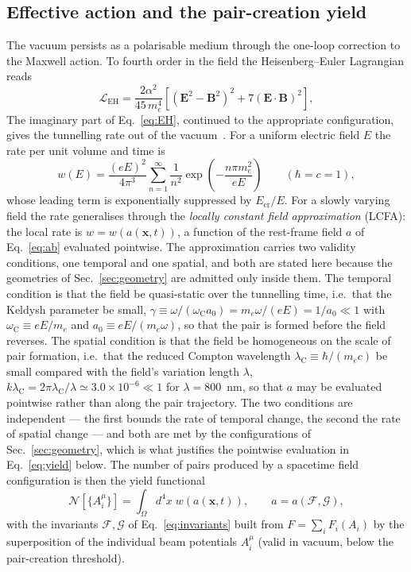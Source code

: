 \documentclass[aps,prd,reprint,superscriptaddress,nofootinbib,floatfix]{revtex4-2}
\begin{document}
\subsection{Effective action and the pair-creation yield}

The vacuum persists as a polarisable medium through the one-loop correction to
the Maxwell action. To fourth order in the field the Heisenberg--Euler
Lagrangian reads~\cite{HeisenbergEuler1936}
\begin{equation}
\mathcal{L}_{\mathrm{EH}}
=\frac{2\alpha^2}{45\,m_e^4}
\left[\left(\mathbf{E}^2-\mathbf{B}^2\right)^2
+7\left(\mathbf{E}\cdot\mathbf{B}\right)^2\right],
\label{eq:EH}
\end{equation}
The imaginary part of Eq.~\eqref{eq:EH}, continued to the appropriate
configuration, gives the tunnelling rate out of the
vacuum~\cite{Schwinger1951}. For a uniform electric
field $E$ the rate per unit volume and time is
\begin{equation}
w(E)=\frac{(eE)^2}{4\pi^3}
\sum_{n=1}^{\infty}\frac{1}{n^2}
\exp\!\left(-\frac{n\pi m_e^2}{eE}\right)
\qquad(\hbar=c=1),
\label{eq:schwinger_rate}
\end{equation}
whose leading term is exponentially suppressed by $E_{\mathrm{cr}}/E$.
For a slowly varying field the rate generalises through the \emph{locally
constant field approximation} (LCFA): the local rate is
$w=w(a(\mathbf{x},t))$, a function of the rest-frame field $a$ of
Eq.~\eqref{eq:ab} evaluated pointwise. The approximation carries two
validity conditions, one temporal and one spatial, and both are stated
here because the geometries of Sec.~\ref{sec:geometry} are admitted only
inside them. The temporal condition is that the field be quasi-static over
the tunnelling time, i.e.\ that the Keldysh parameter be small,
$\gamma\equiv\omega/(\omega_{\mathrm{C}}a_0)=m_e\omega/(eE)=1/a_0\ll1$
with $\omega_{\mathrm{C}}\equiv eE/m_e$ and
$a_0\equiv eE/(m_e\omega)$, so that the pair is formed before the field
reverses. The spatial condition is that the field be homogeneous on the
scale of pair formation, i.e.\ that the reduced Compton wavelength
$\lambda_{\mathrm{C}}\equiv\hbar/(m_ec)$ be small compared with the
field's variation length $\lambda$,
$k\lambda_{\mathrm{C}}=2\pi\lambda_{\mathrm{C}}/\lambda\simeq3.0\times10^{-6}\ll1$ for $\lambda=800$~nm, so that $a$ may be evaluated
pointwise rather than along the pair trajectory. The two conditions are
independent --- the first bounds the rate of temporal change, the second
the rate of spatial change --- and both are met by the configurations of
Sec.~\ref{sec:geometry}, which is what justifies the pointwise evaluation
in Eq.~\eqref{eq:yield} below. The number of pairs produced by a
spacetime field configuration is then the yield functional
\begin{equation}
\mathcal{N}[\{A_i^\mu\}]
=\int_{\Omega} d^4x\;
w\!\left(a(\mathbf{x},t)\right),
\qquad
a = a\!\left(\mathcal{F},\mathcal{G}\right),
\label{eq:yield}
\end{equation}
with the invariants $\mathcal{F},\mathcal{G}$ of Eq.~\eqref{eq:invariants}
built from $F=\sum_i F_i(A_i)$ by the superposition of the individual beam
potentials $A_i^\mu$ (valid in vacuum, below the pair-creation threshold).
\end{document}
